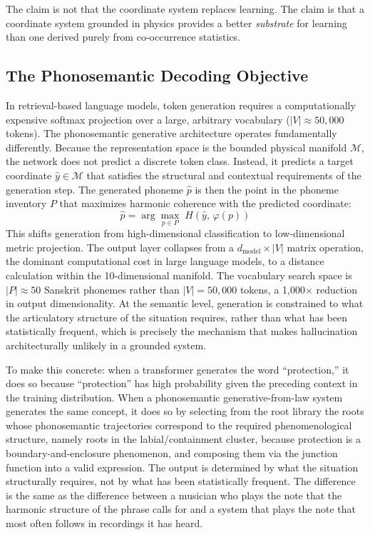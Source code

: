 \documentclass[12pt]{article}
\begin{document}
The claim is not that the coordinate system replaces learning. The claim is that a coordinate system grounded in physics provides a better \textit{substrate} for learning than one derived purely from co-occurrence statistics.

\subsection{The Phonosemantic Decoding Objective}

In retrieval-based language models, token generation requires a computationally expensive softmax projection over a large, arbitrary vocabulary ($|V| \approx 50{,}000$ tokens). The phonosemantic generative architecture operates fundamentally differently. Because the representation space is the bounded physical manifold $\mathcal{M}$, the network does not predict a discrete token class. Instead, it predicts a target coordinate $\hat{y} \in \mathcal{M}$ that satisfies the structural and contextual requirements of the generation step. The generated phoneme $\hat{p}$ is then the point in the phoneme inventory $P$ that maximizes harmonic coherence with the predicted coordinate:
\[
\hat{p} = \arg\max_{p \in P}\; H(\hat{y},\, \varphi(p))
\]
This shifts generation from high-dimensional classification to low-dimensional metric projection. The output layer collapses from a $d_{\text{model}} \times |V|$ matrix operation, the dominant computational cost in large language models, to a distance calculation within the 10-dimensional manifold. The vocabulary search space is $|P| \approx 50$ Sanskrit phonemes rather than $|V| = 50{,}000$ tokens, a 1,000$\times$ reduction in output dimensionality. At the semantic level, generation is constrained to what the articulatory structure of the situation requires, rather than what has been statistically frequent, which is precisely the mechanism that makes hallucination architecturally unlikely in a grounded system.

To make this concrete: when a transformer generates the word ``protection,'' it does so because ``protection'' has high probability given the preceding context in the training distribution. When a phonosemantic generative-from-law system generates the same concept, it does so by selecting from the root library the roots whose phonosemantic trajectories correspond to the required phenomenological structure, namely roots in the labial/containment cluster, because protection is a boundary-and-enclosure phenomenon, and composing them via the junction function into a valid expression. The output is determined by what the situation structurally requires, not by what has been statistically frequent. The difference is the same as the difference between a musician who plays the note that the harmonic structure of the phrase calls for and a system that plays the note that most often follows in recordings it has heard.
\end{document}
